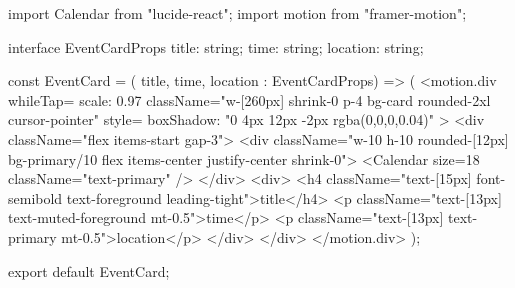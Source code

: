 import { Calendar } from "lucide-react";
import { motion } from "framer-motion";

interface EventCardProps {
  title: string;
  time: string;
  location: string;
}

const EventCard = ({ title, time, location }: EventCardProps) => (
  <motion.div
    whileTap={{ scale: 0.97 }}
    className="w-[260px] shrink-0 p-4 bg-card rounded-2xl cursor-pointer"
    style={{ boxShadow: "0 4px 12px -2px rgba(0,0,0,0.04)" }}
  >
    <div className="flex items-start gap-3">
      <div className="w-10 h-10 rounded-[12px] bg-primary/10 flex items-center justify-center shrink-0">
        <Calendar size={18} className="text-primary" />
      </div>
      <div>
        <h4 className="text-[15px] font-semibold text-foreground leading-tight">{title}</h4>
        <p className="text-[13px] text-muted-foreground mt-0.5">{time}</p>
        <p className="text-[13px] text-primary mt-0.5">{location}</p>
      </div>
    </div>
  </motion.div>
);

export default EventCard;
